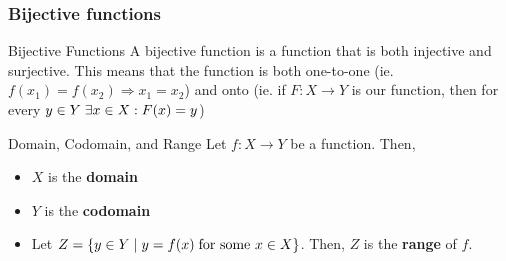 \subsubsection{Bijective functions}
\begin{definition}{Bijective Functions}{}
	A bijective function is a function that is both injective and surjective. This means that the function is both one-to-one (ie. $f(x_1) = f(x_2) \Rightarrow x_1 = x_2$) and onto (ie. if $F: X \to Y$ is our function, then for every $y \in Y \hspace{0.1cm}\exists x \in X : F(x)=y$)
\end{definition}

\begin{definition}{Domain, Codomain, and Range}{}
	Let $f: X \to Y$ be a function. Then,
	\begin{itemize}
		\item $X$ is the \textbf{domain}
		\item $Y$ is the \textbf{codomain}
		\item Let $Z = \left\{ y \in Y \hspace{0.1cm} | \hspace{0.1cm} y=f(x) \hspace{0.1cm} \text{for some } x \in X\right\}$. Then, $Z$ is the \textbf{range} of $f$.
	\end{itemize}
\end{definition}


